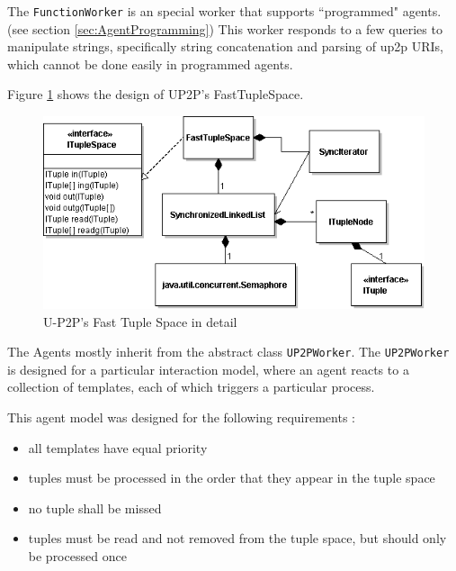\documentclass[titlepage]{article}%
\begin{document}
The \verb.FunctionWorker. is an special worker that supports ``programmed" agents. (see section \ref{sec:AgentProgramming})
This worker responds to a few queries to manipulate strings, specifically string concatenation and parsing of up2p URIs, which cannot be done easily in programmed agents.


Figure \ref{fig:FastTS} shows the design of UP2P's FastTupleSpace.

\begin{figure}[htb]
\centering
	\includegraphics[scale=0.5]{diagrams/UP2PTupleSpaceClasses.png}
	\caption{U-P2P's Fast Tuple Space in detail}
	\label{fig:FastTS}
\end{figure}

The Agents mostly inherit from the abstract class \verb.UP2PWorker.. The \verb.UP2PWorker. is designed for a particular interaction model, where an agent reacts to a collection of templates, each of which triggers a particular process.

This agent model was designed for the following requirements :
\begin{itemize}
\item all templates have equal priority
\item tuples must be processed in the order that they appear in the tuple space
\item no tuple shall be missed
\item tuples must be read and not removed from the tuple space, but should only be processed once
\end{itemize}
\end{document}
